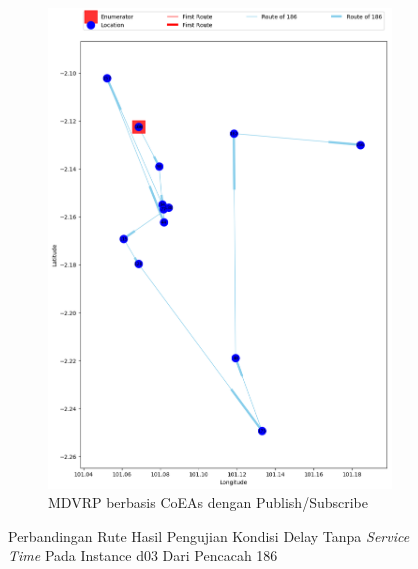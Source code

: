 \begin{figure}[H]\ContinuedFloat
	\centering
	\begin{subfigure}[t]{\textwidth}
		\centering
		\includegraphics[width=\textwidth]{Resources/Images/delayed_3/real_m15_n100_delayed_3_186_pubsub_coes}
		\caption{MDVRP berbasis CoEAs dengan Publish/Subscribe}
		\label{fig:real_m15_n100_delayed_3_186_pubsub_coes}
	\end{subfigure}
	\caption{Perbandingan Rute Hasil Pengujian Kondisi Delay Tanpa \textit{Service Time} Pada Instance d03 Dari Pencacah 186}
	\label{fig:real_m15_n100_delayed_3_186_contd}
\end{figure}


